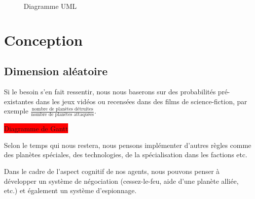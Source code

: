 \documentclass{article}
\newcommand{\TODO}[1]{\colorbox{red}{#1}}
\begin{document}
    \begin{figure}
      \begin{center}
      \end{center}
      \caption{Diagramme UML}
    \end{figure}

  \section{Conception}
    \subsection{Dimension aléatoire}
      Si le besoin s'en fait ressentir, nous nous baserons sur des probabilités pré-existantes dans les jeux vidéos ou recensées dans des films de science-fiction, par exemple $\displaystyle \frac{\text{nombre de planètes détruites}}{\text{nombre de planètes attaquées}} $.
    

\TODO{Diagramme de Gantt}

    Selon le temps qui nous restera, nous pensons implémenter d'autres règles comme des planètes spéciales, des technologies, de la spécialisation dans les factions etc.

    Dans le cadre de l'aspect cognitif de nos agents, nous pouvons penser à développer un système de négociation (cessez-le-feu, aide d'une planète alliée, etc.) et également un système d'espionnage.
\end{document}
